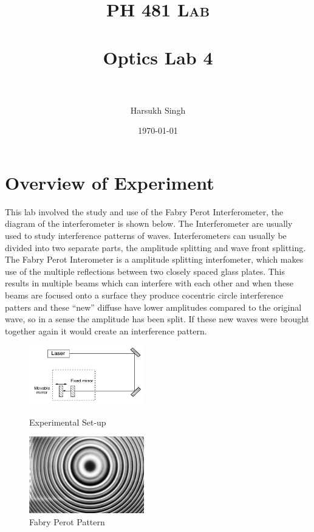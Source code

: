 \documentclass[paper=a4, fontsize=11pt]{scrartcl} %
\title{	
\normalfont \normalsize 
\textsc{PH 481 Lab} \\ [25pt] %
\horrule{2pt} \\[0.5cm] %
\huge Optics Lab 4\\ %
\horrule{2pt} \\[0.5cm] %
}
\author{Harsukh Singh} %
\date{\normalsize \today} %
\numberwithin{equation}{section} %
\numberwithin{figure}{section} %
\numberwithin{table}{section} %
\begin{document}
\maketitle %
\section{Overview of Experiment}
This lab involved the study and use of the Fabry Perot Interferometer, the diagram of the interferometer is shown below.  The Interferometer are usually used to study interference patterns of waves. Interferometers can usually be divided into two separate parts, the amplitude splitting and wave front splitting. The Fabry Perot Interometer is a amplitude splitting interfometer, which makes use of the multiple reflections between two closely spaced glass plates. This results in multiple beams which can interfere with each other and when these beams are focused onto a surface they produce cocentric circle interference patters and  these ``new'' diffuse have lower amplitudes compared to the original wave, so in a sense the amplitude has been split. If  these new waves were brought together again it would create an interference pattern. 
\begin{figure}[htb]
\centering
\parbox{5cm}{
\includegraphics[width=5cm]{exp}
\caption{Experimental Set-up}
\label{fig:2figsA}}
\qquad
\begin{minipage}{5cm}
\includegraphics[width=5cm]{fpat}
\caption{Fabry Perot Pattern}
\label{fig:2figsB}
\end{minipage}
\end{figure}
\end{document}

